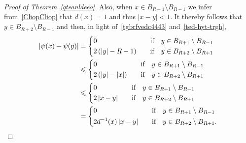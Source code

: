 \documentclass[12pt]{article}
\numberwithin{equation}{section}
\renewcommand{\leq}{\leqslant}
\begin{document}
\begin{proof}[Proof of Theorem~\ref{qteanldeeo}]
Also, when $x\in B_{R+1}\setminus B_{R-1}$ we infer from~\eqref{CliopCliop} that 
$d(x)=1$ and thus $\left|x-y\right|<1$. It thereby follows that $y\in B_{R+2}\setminus B_{R-1}$ and then, in light of~\eqref{tgbrfvedc4443} and~\eqref{ted-hyt-trgh}, 
\begin{equation}\label{reveleoep7}
\begin{split}
\left|\psi(x)-\psi(y)\right| & = \begin{dcases}
 0             \quad &\mbox{if}\quad y\in B_{R+1}  \setminus  B_{R-1}\\
 2\left(\left|y\right|-R-1\right) \quad &\mbox{if}\quad y\in B_{R+2}\setminus B_{R+1}
\end{dcases}\\
& \leq \begin{dcases}
 0             \quad &\mbox{if}\quad y\in B_{R+1}  \setminus  B_{R-1}\\
2\left(\left|y\right|-\left|x\right|\right) \quad &\mbox{if}\quad y\in B_{R+2}\setminus B_{R+1}
\end{dcases}\\
&\leq \begin{dcases}
 0             \quad &\mbox{if}\quad y\in B_{R+1}  \setminus  B_{R-1}\\
2\left|x-y\right| \quad &\mbox{if}\quad y\in B_{R+2}\setminus B_{R+1}
\end{dcases}\\
&=\begin{dcases}
 0             \quad &\mbox{if}\quad y\in B_{R+1}  \setminus  B_{R-1}\\
2d^{-1}(x) \left|x-y\right|\quad &\mbox{if}\quad y\in B_{R+2}\setminus B_{R+1}.
\end{dcases}
\end{split}
\end{equation}


\end{proof}
\end{document}
